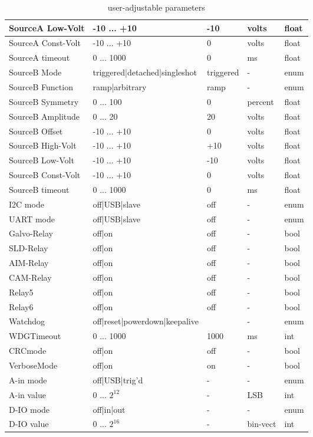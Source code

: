 \begin{table}[H]
\begin{tabular}{l|p{65mm}|l|l|l}
			SourceA Low-Volt	& -10 ... +10					& -10			& volts		& float	\\ \hline
			SourceA Const-Volt	& -10 ... +10					& 0				& volts		& float	\\ \hline
			SourceA timeout		& 0 ... 1000					& 0				& ms		& float	\\ \hline
			SourceB Mode		& triggered|detached|singleshot	& triggered		& -			& enum	\\ \hline	
			SourceB Function	& ramp|arbitrary				& ramp			& -			& enum	\\ \hline	
			SourceB Symmetry	& 0	... 100						& 0				& percent	& float	\\ \hline
			SourceB Amplitude	& 0	...  20						& 20			& volts		& float	\\ \hline
			SourceB Offset		& -10 ... +10					& 0				& volts		& float	\\ \hline
			SourceB High-Volt	& -10 ... +10					& +10			& volts		& float	\\ \hline
			SourceB Low-Volt	& -10 ... +10					& -10			& volts		& float	\\ \hline
			SourceB Const-Volt	& -10 ... +10					& 0				& volts		& float	\\ \hline
			SourceB timeout		& 0 ... 1000					& 0				& ms		& float	\\ \hline
			I2C mode    	   	& off|USB|slave 				& off			& -			& enum	\\ \hline
			UART mode	     	& off|USB|slave 				& off			& -			& enum	\\ \hline
			Galvo-Relay			& off|on						& off			& -			& bool	\\ \hline
			SLD-Relay			& off|on						& off			& -			& bool	\\ \hline
			AIM-Relay			& off|on						& off			& -			& bool	\\ \hline
			CAM-Relay			& off|on						& off			& -			& bool	\\ \hline
			Relay5				& off|on						& off			& -			& bool	\\ \hline
			Relay6				& off|on						& off			& -			& bool	\\ \hline
			Watchdog			& off|reset|powerdown|keepalive &				& -			& enum	\\ \hline
			WDGTimeout			& 0 ... 1000					& 1000			& ms		& int	\\ \hline
			CRCmode				& off|on						& off			& -			& bool	\\ \hline
			VerboseMode			& off|on						& on			& -			& bool	\\ \hline
			A-in mode			& off|USB|trig'd 				& -				& -			& enum	\\ \hline
			A-in value			& 0 ... $2^{12}$				& -				& LSB		& int	\\ \hline
			D-IO mode			& off|in|out 					& -				& -			& enum	\\ \hline
			D-IO value			& 0 ... $2^{16}$				& -				& bin-vect	& int	\\ \hline
					\end{tabular}
				\caption{user-adjustable parameters}
			\label{tab:params}
		\end{table}

